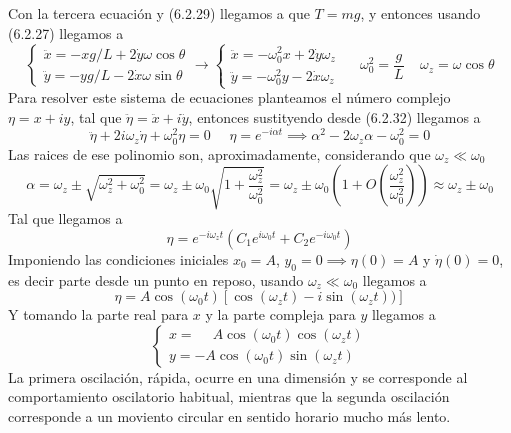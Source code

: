Con la tercera ecuación y (6.2.29) llegamos a que $T=mg$, y entonces usando (6.2.27) llegamos a 
\begin{equation} \label{6.1.1}
    \left\{\begin{matrix}
        \ddot{x} = -xg/L  +2\dot{y}\omega\cos\theta \\
        \ddot{y} = -yg/L -2\dot{x}\omega \sin\theta
      \end{matrix}\right. \rightarrow
    \left\{\begin{matrix}
        \ddot{x} = -\omega_0^2 x  +2\dot{y}\omega_z \\
        \ddot{y} = -\omega_0^2 y -2\dot{x}\omega_z
    \end{matrix}\right. \ \ \ \ \ \ \omega_0^2 = \frac{g}{L} \ \ \ \ \ \omega_z = \omega \cos\theta
\end{equation} 
Para resolver este sistema de ecuaciones planteamos el número complejo $\eta = x+iy$, tal que $\ddot{\eta} = \ddot{x}+ i\ddot{y}$, entonces sustityendo desde (6.2.32) llegamos a 
\begin{equation} \label{6.1.1}
    \ddot{\eta} + 2 i \omega_z \dot{\eta} + \omega_0^2 \eta = 0 \ \ \ \ \ \ \eta = e^{-i\alpha t} \implies \alpha^2 -2\omega_z\alpha-\omega_0^2 = 0
\end{equation} 
Las raices de ese polinomio son, aproximadamente, considerando que $\omega_z \ll \omega_0$
\begin{equation} \label{6.1.1}
    \alpha = \omega_z \pm \sqrt{\omega_z^2+\omega_0^2} = \omega_z \pm \omega_0 \sqrt{1+\frac{\omega_z^2}{\omega_0^2}} = \omega_z \pm \omega_0 \left(1 + O\left(\frac{\omega_z^2}{\omega_0^2}\right)\right) \approx \omega_z \pm \omega_0
\end{equation} 
Tal que llegamos a 
\begin{equation} \label{6.1.1}
    \eta = e^{-i\omega_z t}\left(C_1 e^{i\omega_0t}+C_2e^{-i\omega_0t}\right)
\end{equation} 
Imponiendo las condiciones iniciales $x_0 = A$, $y_0 = 0 \implies \eta(0) = A$ y $\dot{\eta}(0) = 0$, es decir parte desde un punto en reposo, usando $\omega_z \ll \omega_0$ llegamos a 
\begin{equation} \label{6.1.1}
    \eta = A \cos(\omega_0t)\left[\cos(\omega_zt) -i \sin(\omega_zt))\right]
\end{equation} 
Y tomando la parte real para $x$ y la parte compleja para $y$ llegamos a 
\begin{equation} \label{6.1.1}
    \left\{\begin{matrix}
        x = \phantom{-}A \cos(\omega_0t)\cos(\omega_zt) \\
        y = -A \cos(\omega_0t)\sin(\omega_zt)
    \end{matrix}\right.
\end{equation} 
La primera oscilación, rápida, ocurre en una dimensión y se corresponde al comportamiento oscilatorio habitual, mientras que la segunda oscilación corresponde a un moviento circular en sentido horario mucho más lento.